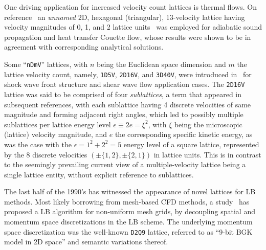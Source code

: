     One    driving    application     for     increased     velocity     count     lattices     is     thermal     flows.     On
    reference~\cite{1993-AlexanderFJ+SterlingJD-PhysRevE} an \emph{unnamed}  2D,  hexagonal  (triangular),  13-velocity  lattice
    having velocity magnitudes of 0,  1,  and  2  lattice  units~\cite{1998-ChenS+DoolenGD-AnnuRevFluidMech}  was  employed  for
    adiabatic sound propagation and heat transfer Couette flow, whose results were shown to be in agreement  with  corresponding
    analytical solutions.

    Some ``\texttt{nDmV}'' lattices, with $n$ being the Euclidean space dimension and $m$ the lattice  velocity  count,  namely,
    \texttt{1D5V}, \texttt{2D16V}, and \texttt{3D40V}, were introduced  in~\cite{1994-ChenY+AkiyamaM-PhysRevE}  for  shock  wave
    front structure and shear wave flow application cases.  The  \texttt{2D16V}  lattice  was  said  to  be  comprised  of  four
    \emph{sublattices}, a term that appeared in subsequent references, with each sublattice having 4 discrete velocities of same
    magnitude and forming adjacent right angles, which led to possibly multiple sublattices per lattice energy  level  $\epsilon
    \equiv 2e = \xi^2$, with $\xi$ being the microscopic (lattice)  velocity  magnitude,  and  $e$  the  corresponding  specific
    kinetic energy, as was the case with the $\epsilon = 1^2 + 2^2 = 5$ energy level of a square lattice, represented by  the  8
    discrete velocities $(\pm\{1,2\},\pm\{2,1\})$ in lattice units. This is in contrast to the seemingly prevailing current view
    of a multiple-velocity lattice being a single lattice entity, without explicit reference to sublattices.

    The last half of the 1990's has witnessed the appearance of novel lattices  for  LB  methods.  Most  likely  borrowing  from
    mesh-based CFD methods, a study~\cite{1996-HeX+DemboM-JComputPhys} has proposed a LB algorithm for non-uniform  mesh  grids,
    by decoupling spatial and momentum space discretizations in the LB scheme. The underlying momentum space discretization  was
    the well-known \texttt{D2Q9} lattice, referred to as ``9-bit BGK model in 2D space'' and semantic variations thereof.





